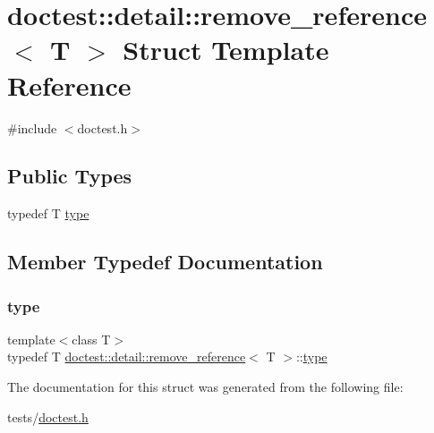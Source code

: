 \hypertarget{structdoctest_1_1detail_1_1remove__reference}{}\section{doctest\+:\+:detail\+:\+:remove\+\_\+reference$<$ T $>$ Struct Template Reference}
\label{structdoctest_1_1detail_1_1remove__reference}


{\ttfamily \#include $<$doctest.\+h$>$}

\subsection*{Public Types}
\begin{DoxyCompactItemize}
\item 
typedef T \hyperlink{structdoctest_1_1detail_1_1remove__reference_ab3cba0e8bc4c71b7f4ecdf85476ec4cc}{type}
\end{DoxyCompactItemize}


\subsection{Member Typedef Documentation}
\mbox{\label{structdoctest_1_1detail_1_1remove__reference_ab3cba0e8bc4c71b7f4ecdf85476ec4cc}} 
\subsubsection{\texorpdfstring{type}{type}}
{\footnotesize\ttfamily template$<$class T$>$ \\
typedef T \hyperlink{structdoctest_1_1detail_1_1remove__reference}{doctest\+::detail\+::remove\+\_\+reference}$<$ T $>$\+::\hyperlink{structdoctest_1_1detail_1_1remove__reference_ab3cba0e8bc4c71b7f4ecdf85476ec4cc}{type}}



The documentation for this struct was generated from the following file\+:\begin{DoxyCompactItemize}
\item 
tests/\hyperlink{doctest_8h}{doctest.\+h}\end{DoxyCompactItemize}
